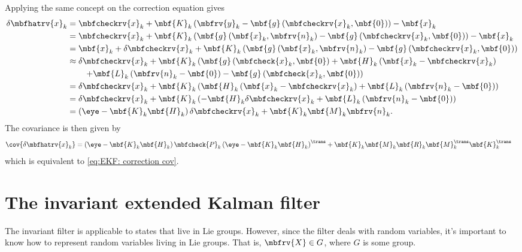 \documentclass[nobib, nofonts, notoc, justified]{tufte-handout}
\begin{document}
  Applying the same concept on the correction equation gives
  \begin{align}
    \delta\mbfhatrv{x}_{k} 
    &= \mbfcheckrv{x}_{k} + \mbf{K}_{k}\left( \mbfrv{y}_{k} - \mbf{g}\left( \mbfcheckrv{x}_{k}, \mbf{0} \right) \right) - \mbf{x}_{k}\\
    &= \mbfcheckrv{x}_{k} + \mbf{K}_{k}\left( \mbf{g}\left( \mbf{x}_{k},\mbfrv{n}_{k} \right) - \mbf{g}\left( \mbfcheckrv{x}_{k}, \mbf{0} \right) \right) - \mbf{x}_{k}\\
    &= \mbf{x}_{k} + \delta\mbfcheckrv{x}_{k} + \mbf{K}_{k}\left( \mbf{g}\left( \mbf{x}_{k},\mbfrv{n}_{k} \right) - \mbf{g}\left( \mbfcheckrv{x}_{k}, \mbf{0} \right) \right)\\
    &\approx \delta\mbfcheckrv{x}_{k} +\mbf{K}_{k}\left( \mbf{g}\left( \mbfcheck{x}_{k}, \mbf{0} \right) + \mbf{H}_{k}\left( \mbf{x}_{k} - \mbfcheckrv{x}_{k} \right) \right.\nonumber\\&\qquad \left.+ \mbf{L}_{k}\left( \mbfrv{n}_{k}-\mbf{0} \right) - \mbf{g}\left( \mbfcheck{x}_{k},\mbf{0} \right) \right)\\
    &= \delta\mbfcheckrv{x}_{k} +\mbf{K}_{k}\left( \mbf{H}_{k}\left( \mbf{x}_{k} - \mbfcheckrv{x}_{k} \right) + \mbf{L}_{k}\left( \mbfrv{n}_{k}-\mbf{0} \right) \right)\\
    &= \delta\mbfcheckrv{x}_{k} +\mbf{K}_{k}\left( -\mbf{H}_{k}\delta\mbfcheckrv{x}_{k} + \mbf{L}_{k}\left( \mbfrv{n}_{k}-\mbf{0} \right) \right)\\
    &= \left( \eye - \mbf{K}_{k}\mbf{H}_{k} \right)\delta\mbfcheckrv{x}_{k} + \mbf{K}_{k}\mbf{M}_{k}\mbfrv{n}_{k}.
  \end{align}
  The covariance is then given by
  \begin{align}
    \cov{\delta\mbfhatrv{x}_{k}} &= \left( \eye - \mbf{K}_{k}\mbf{H}_{k} \right)\mbfcheck{P}_{k}\left( \eye - \mbf{K}_{k}\mbf{H}_{k} \right)^{\trans} + \mbf{K}_{k}\mbf{M}_{k}\mbf{R}_{k}\mbf{M}_{k}^{\trans}\mbf{K}_{k}^{\trans}
  \end{align}
  which is equivalent to \eqref{eq:EKF: correction cov}.

  \section{The invariant extended Kalman filter}
  The invariant filter\cite{Barrau_Invariant_2018} is applicable to states that live in Lie groups. However, since the filter deals with random variables, it's important to know how to represent random variables living in Lie groups. That is, $\mbfrv{X}\in G$, where $G$ is some group.
\end{document}
